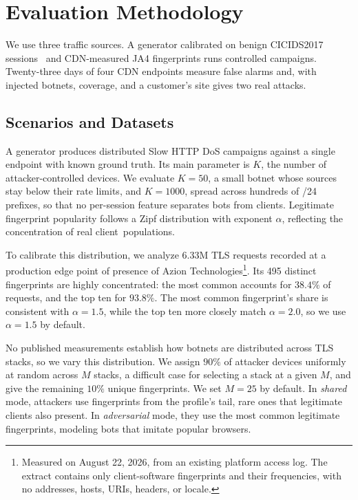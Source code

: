\documentclass[conference,letterpaper,10pt]{IEEEtran}
\newcommand\1{\textit{(i)}}
\newcommand\2{\textit{(ii)}}
\newcommand\3{\textit{(iii)}}
\newcommand\4{\textit{(iv)}}
\newcommand\5{\textit{(v)}}
\newcommand\6{\textit{(vi)}}
\newcommand\7{\textit{(vii)}}
\newcommand\8{\textit{(viii)}}
\newcommand\9{\textit{(ix)}}
\begin{document}

\section{Evaluation Methodology}
\label{sec:method}

We use three traffic sources. A generator calibrated on benign CICIDS2017 sessions~\cite{sharafaldin2018cicids} and CDN-measured JA4 fingerprints runs controlled campaigns. Twenty-three days of four CDN endpoints measure false alarms and, with injected botnets, coverage, and a customer's site gives two real attacks.

\subsection{Scenarios and Datasets}

A generator produces distributed Slow HTTP DoS campaigns against a single endpoint with known ground truth. Its main parameter is $K$, the number of attacker-controlled devices. We evaluate $K=50$, a small botnet whose sources stay below their rate limits, and $K=1000$, spread across hundreds of /24 prefixes, so that no per-session feature separates bots from clients. Legitimate fingerprint popularity follows a Zipf distribution with exponent $\alpha$, reflecting the concentration of real client~populations.

To calibrate this distribution, we analyze $6.33$M TLS requests recorded at a production edge point of presence of Azion Technologies\footnote{Measured on August 22, 2026, from an existing platform access log. The extract contains only client-software fingerprints and their frequencies, with no addresses, hosts, URIs, headers, or locale.}. Its 495 distinct fingerprints are highly concentrated: the most common accounts for $38.4\%$ of requests, and the top ten for $93.8\%$. The most common fingerprint's share is consistent with $\alpha=1.5$, while the top ten more closely match $\alpha=2.0$, so we use $\alpha=1.5$ by default.

No published measurements establish how botnets are distributed across TLS stacks, so we vary this distribution. We assign $90\%$ of attacker devices uniformly at random across $M$ stacks, a difficult case for selecting a stack at a given $M$, and give the remaining $10\%$ unique fingerprints. We set $M=25$ by default. In \textit{shared} mode, attackers use fingerprints from the profile's tail, rare ones that legitimate clients also present. In \textit{adversarial} mode, they use the most common legitimate fingerprints, modeling bots that imitate popular browsers.
\end{document}
